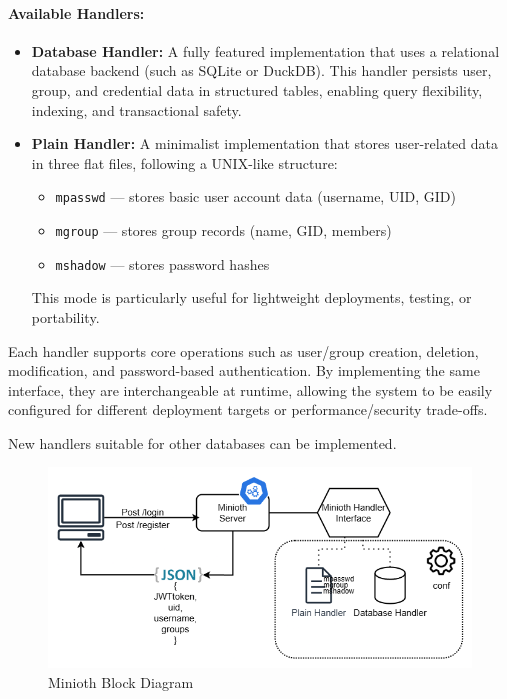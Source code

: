 \paragraph{Available Handlers:}
\begin{itemize}
    \item \textbf{Database Handler:}  
    A fully featured implementation that uses a relational database backend (such as SQLite or DuckDB). This handler persists user, group, and credential data in structured tables, enabling query flexibility, indexing, and transactional safety.

    \item \textbf{Plain Handler:}  
    A minimalist implementation that stores user-related data in three flat files, following a UNIX-like structure:
    \begin{itemize}
        \item \texttt{mpasswd} — stores basic user account data (username, UID, GID)
        \item \texttt{mgroup} — stores group records (name, GID, members)
        \item \texttt{mshadow} — stores password hashes
    \end{itemize}
    This mode is particularly useful for lightweight deployments, testing, or portability.
\end{itemize}

Each handler supports core operations such as user/group creation, deletion, modification, and password-based authentication. 
By implementing the same interface, they are interchangeable at runtime, allowing the system to be easily configured for 
different deployment targets or performance/security trade-offs. 

New handlers suitable for other databases can be implemented.

\begin{figure}[h!]
  \centering
  \includegraphics[width=1\textwidth]{Images/minioth-blockdiagram.png}
  \caption{Minioth Block Diagram}
  \label{fig:minioth-blockdiagram}
\end{figure}

